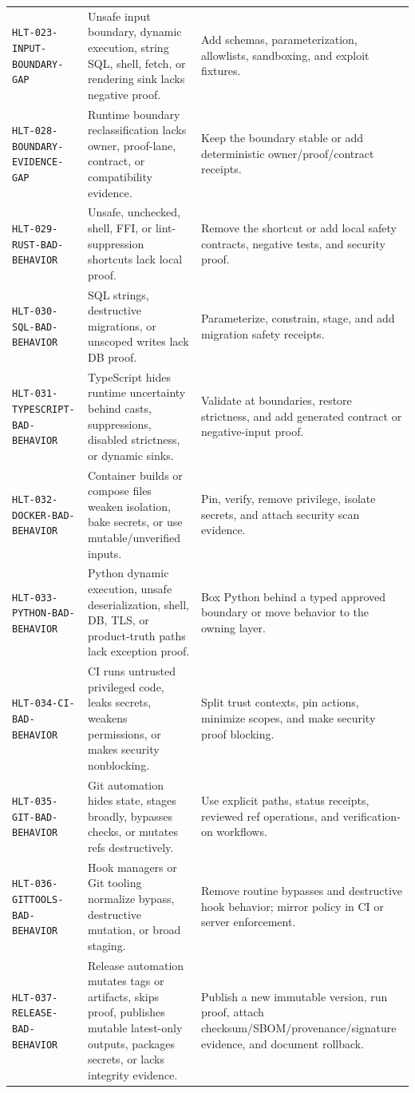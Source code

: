 \begin{table}[t]
\begin{tabularx}{\textwidth}{L{0.28\textwidth} Y Y}
\texttt{HLT-023-INPUT-BOUNDARY-GAP} & Unsafe input boundary, dynamic execution, string SQL, shell, fetch, or rendering sink lacks negative proof. & Add schemas, parameterization, allowlists, sandboxing, and exploit fixtures. \\
\texttt{HLT-028-BOUNDARY-EVIDENCE-GAP} & Runtime boundary reclassification lacks owner, proof-lane, contract, or compatibility evidence. & Keep the boundary stable or add deterministic owner/proof/contract receipts. \\
\texttt{HLT-029-RUST-BAD-BEHAVIOR} & Unsafe, unchecked, shell, FFI, or lint-suppression shortcuts lack local proof. & Remove the shortcut or add local safety contracts, negative tests, and security proof. \\
\texttt{HLT-030-SQL-BAD-BEHAVIOR} & SQL strings, destructive migrations, or unscoped writes lack DB proof. & Parameterize, constrain, stage, and add migration safety receipts. \\
\texttt{HLT-031-TYPESCRIPT-BAD-BEHAVIOR} & TypeScript hides runtime uncertainty behind casts, suppressions, disabled strictness, or dynamic sinks. & Validate at boundaries, restore strictness, and add generated contract or negative-input proof. \\
\texttt{HLT-032-DOCKER-BAD-BEHAVIOR} & Container builds or compose files weaken isolation, bake secrets, or use mutable/unverified inputs. & Pin, verify, remove privilege, isolate secrets, and attach security scan evidence. \\
\texttt{HLT-033-PYTHON-BAD-BEHAVIOR} & Python dynamic execution, unsafe deserialization, shell, DB, TLS, or product-truth paths lack exception proof. & Box Python behind a typed approved boundary or move behavior to the owning layer. \\
\texttt{HLT-034-CI-BAD-BEHAVIOR} & CI runs untrusted privileged code, leaks secrets, weakens permissions, or makes security nonblocking. & Split trust contexts, pin actions, minimize scopes, and make security proof blocking. \\
\texttt{HLT-035-GIT-BAD-BEHAVIOR} & Git automation hides state, stages broadly, bypasses checks, or mutates refs destructively. & Use explicit paths, status receipts, reviewed ref operations, and verification-on workflows. \\
\texttt{HLT-036-GITTOOLS-BAD-BEHAVIOR} & Hook managers or Git tooling normalize bypass, destructive mutation, or broad staging. & Remove routine bypasses and destructive hook behavior; mirror policy in CI or server enforcement. \\
\texttt{HLT-037-RELEASE-BAD-BEHAVIOR} & Release automation mutates tags or artifacts, skips proof, publishes mutable latest-only outputs, packages secrets, or lacks integrity evidence. & Publish a new immutable version, run proof, attach checksum/SBOM/provenance/signature evidence, and document rollback. \\
\bottomrule
\end{tabularx}
\end{table}

